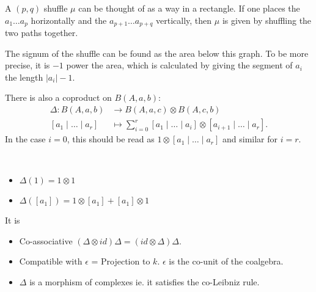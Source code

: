 \begin{rem}
A $(p,q)$ shuffle $\mu$ can be thought of as a way in a rectangle. 
If one places the $a_1 \ldots a_p$ horizontally and the $a_{p+1}\ldots a_{p+q}$ vertically, then $\mu$ is given by shuffling the two paths together. 
\begin{center}
\end{center}
The signum of the shuffle can be found as the area below this graph. To be more precise, it is $-1$ power the area, which is calculated by giving the segment of $a_i$ the length $|a_i|-1$. 
\end{rem}


\begin{defn}
There is also a coproduct on $B(A, a, b)$:
\begin{align*}
  \Delta : B(A,a,b) &\to B(A,a,c) \otimes B(A,c,b) \\
  [a_1 \mid \ldots \mid a_r] &\mapsto \sum_{i=0}^r [a_1 \mid \ldots \mid a_i] \otimes [a_{i+1} \mid \ldots \mid a_r].
\end{align*}
In the case $i=0$, this should be read as $1 \otimes [a_1 \mid \ldots \mid a_r]$ and similar for $i=r$. 
\end{defn}

\begin{exam} \ 
\begin{itemize}
\item $\Delta(1)      = 1 \otimes 1 $
\item $\Delta([a_1])  = 1 \otimes [a_1] + [a_1] \otimes 1 $
\end{itemize}
\end{exam}


It is
\begin{itemize}
\item Co-associative $(\Delta \otimes id) \Delta = (id \otimes \Delta) \Delta$.
\item Compatible with $\epsilon $ = Projection to $k$. $\epsilon$ is the co-unit of the coalgebra. 
\item $\Delta$ is a morphism of complexes ie. it satisfies the co-Leibniz rule.
\end{itemize}

